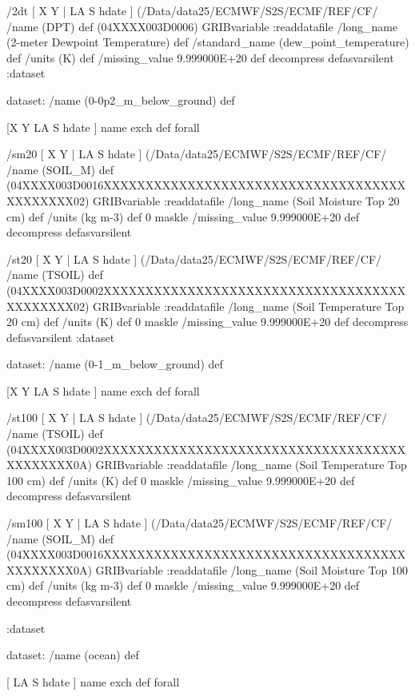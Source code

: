 \begin{ingrid}
{%
/2dt { [ X Y | LA S hdate ] (/Data/data25/ECMWF/S2S/ECMF/REF/CF/%
/name (DPT) def
(04XXXX003D0006) GRIBvariable
:readdatafile
/long_name (2-meter Dewpoint Temperature) def
/standard_name (dew_point_temperature) def
/units (K) def
/missing_value 9.999000E+20 def
decompress
} defasvarsilent
:dataset

dataset:
/name (0-0p2_m_below_ground) def

[X Y LA S hdate ] {name exch def } forall

/sm20 { [ X Y | LA S hdate ] (/Data/data25/ECMWF/S2S/ECMF/REF/CF/%
/name (SOIL_M) def
(04XXXX003D0016XXXXXXXXXXXXXXXXXXXXXXXXXXXXXXXXXXXXXXXXXXXX02) GRIBvariable
:readdatafile
/long_name (Soil Moisture Top 20 cm) def
/units (kg m-3) def
0 maskle
/missing_value 9.999000E+20 def
decompress
} defasvarsilent

/st20 { [ X Y | LA S hdate ] (/Data/data25/ECMWF/S2S/ECMF/REF/CF/%
/name (TSOIL) def
(04XXXX003D0002XXXXXXXXXXXXXXXXXXXXXXXXXXXXXXXXXXXXXXXXXXXX02) GRIBvariable
:readdatafile
/long_name (Soil Temperature Top 20 cm) def
/units (K) def
0 maskle
/missing_value 9.999000E+20 def
decompress
} defasvarsilent
:dataset

dataset:
/name (0-1_m_below_ground) def

[X Y LA S hdate ] {name exch def } forall

/st100 { [ X Y | LA S hdate ] (/Data/data25/ECMWF/S2S/ECMF/REF/CF/%
/name (TSOIL) def
(04XXXX003D0002XXXXXXXXXXXXXXXXXXXXXXXXXXXXXXXXXXXXXXXXXXXX0A) GRIBvariable
:readdatafile
/long_name (Soil Temperature Top 100 cm) def
/units (K) def
0 maskle
/missing_value 9.999000E+20 def
decompress
} defasvarsilent

/sm100 { [ X Y | LA S hdate ] (/Data/data25/ECMWF/S2S/ECMF/REF/CF/%
/name (SOIL_M) def
(04XXXX003D0016XXXXXXXXXXXXXXXXXXXXXXXXXXXXXXXXXXXXXXXXXXXX0A) GRIBvariable
:readdatafile
/long_name (Soil Moisture Top 100 cm) def
/units (kg m-3) def
0 maskle
/missing_value 9.999000E+20 def
decompress
} defasvarsilent

:dataset

dataset:
/name (ocean) def

[ LA S hdate ] {name exch def } forall

}
\end{ingrid}
